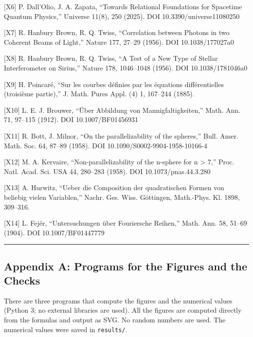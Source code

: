 \documentclass[
  a4paper,
]{article}
\begin{document}
{[}X6{]} P. Dall'Olio, J. A. Zapata, ``Towards Relational Foundations
for Spacetime Quantum Physics,'' Universe 11(8), 250 (2025). DOI
10.3390/universe11080250

{[}X7{]} R. Hanbury Brown, R. Q. Twiss, ``Correlation between Photons in
two Coherent Beams of Light,'' Nature 177, 27--29 (1956). DOI
10.1038/177027a0

{[}X8{]} R. Hanbury Brown, R. Q. Twiss, ``A Test of a New Type of
Stellar Interferometer on Sirius,'' Nature 178, 1046--1048 (1956). DOI
10.1038/1781046a0

{[}X9{]} H. Poincaré, ``Sur les courbes définies par les équations
différentielles (troisième partie),'' J. Math. Pures Appl. (4) 1,
167--244 (1885).

{[}X10{]} L. E. J. Brouwer, ``Über Abbildung von Mannigfaltigkeiten,''
Math. Ann. 71, 97--115 (1912). DOI 10.1007/BF01456931

{[}X11{]} R. Bott, J. Milnor, ``On the parallelizability of the
spheres,'' Bull. Amer. Math. Soc. 64, 87--89 (1958). DOI
10.1090/S0002-9904-1958-10166-4

{[}X12{]} M. A. Kervaire, ``Non-parallelizability of the n-sphere for n
\textgreater{} 7,'' Proc. Natl. Acad. Sci. USA 44, 280--283 (1958). DOI
10.1073/pnas.44.3.280

{[}X13{]} A. Hurwitz, ``Ueber die Composition der quadratischen Formen
von beliebig vielen Variablen,'' Nachr. Ges. Wiss. Göttingen,
Math.-Phys. Kl. 1898, 309--316.

{[}X14{]} L. Fejér, ``Untersuchungen über Fouriersche Reihen,'' Math.
Ann. 58, 51--69 (1904). DOI 10.1007/BF01447779

\begin{center}\rule{0.5\linewidth}{0.5pt}\end{center}

\subsection{Appendix A: Programs for the Figures and the
Checks}\label{appendix-a-programs-for-the-figures-and-the-checks}

There are three programs that compute the figures and the numerical
values (Python 3; no external libraries are used). All the figures are
computed directly from the formulas and output as SVG. No random numbers
are used. The numerical values were saved in \texttt{results/\allowbreak{}}.
\end{document}
